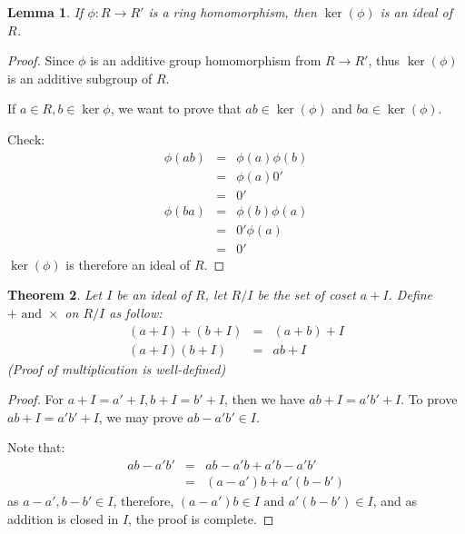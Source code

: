 \documentclass{article}
\theoremstyle{MyNonumberplain}
\theoremstyle{break}
\newtheorem*{proof}{Proof. }
\newcommand{\infixand}{\text{ and }}
\theoremstyle{break}
\newtheorem{theorem}{Theorem}[section]
\newtheorem{lemma}[theorem]{Lemma}
\theoremstyle{break}
\theoremstyle{definition}
\theoremstyle{break}
\begin{document}
\begin{thmbox}
    \begin{lemma}
        If $\phi : R \rightarrow R'$ is a ring homomorphism, then $\ker (\phi)$ is an
        ideal of $R$.
    \end{lemma}
    \begin{prfbox}
        \begin{proof}
            Since $\phi$ is an additive group homomorphism from $R \rightarrow R'$,
            thus $\ker (\phi)$ is an additive subgroup of $R$.\bigskip
            
            If $a \in R, b \in \ker \phi$, we want to prove that $a b \in \ker (\phi)$ and
            $b a \in \ker (\phi)$.\bigskip
            
            Check:
            \begin{eqnarray*}
              \phi (a b) & = & \phi (a) \phi (b)\\
              & = & \phi (a) 0'\\
              & = & 0'\\
              \phi (b a) & = & \phi (b) \phi (a)\\
              & = & 0' \phi (a)\\
              & = & 0'
            \end{eqnarray*}
            $\ker (\phi)$ is therefore an ideal of $R$.
        \end{proof}
    \end{prfbox}
\end{thmbox}

\begin{thmbox}
    \begin{theorem}
        Let $I$ be an ideal of $R$, let $R / I$ be the set of coset $a + I$. Define $+
        \infixand \times$ on $R / I$ as follow:
        \begin{eqnarray*}
          (a + I) + (b + I) & = & (a + b) + I\\
          (a + I) (b + I) & = & a b + I
        \end{eqnarray*}
        (Proof of multiplication is well-defined)
    \end{theorem}
    \begin{prfbox}
        \begin{proof}
            For $a + I = a' + I, b + I = b' + I$, then we have $a b + I = a' b' + I$. To
            prove $a b + I = a' b' + I$, we may prove $a b - a' b' \in I$.\bigskip
            
            Note that:
            \begin{eqnarray*}
              a b - a' b' & = & a b - a' b + a' b - a' b'\\
              & = & (a - a') b + a' (b - b')
            \end{eqnarray*}
            as $a - a', b - b' \in I$, therefore, $(a - a') b \in I \infixand a' (b - b')
            \in I$, and as addition is closed in $I$, the proof is complete.
        \end{proof}
    \end{prfbox}
\end{thmbox}
\end{document}
